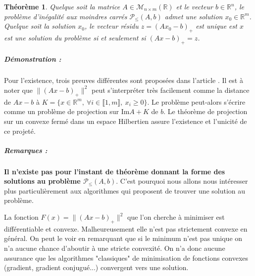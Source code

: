 \documentclass[10pt,a4paper]{article}
\newtheorem{thm}{Théorème}
\begin{document}
\begin{thm}
  Quelque soit la matrice $A \in \mathcal{M}_{n \times m}(\mathbb{R})$ et le vecteur $b \in \mathbb{R}^n$, le problème d'inégalité aux moindres carrés $\mathcal{P}_{\leq}(A, b)$ admet une solution $x_0 \in \mathbb{R}^m$.
  Quelque soit la solution $x_0$, le vecteur résidu $z = (Ax_0 - b)_+$ est unique est $x$ est une solution du problème si et seulement si $(Ax - b)_+ = z$.
\end{thm}
\subparagraph{Démonstration :}
Pour l'existence, trois preuves différentes sont proposées dans l'article \cite{LSCHUP}. Il est à noter que $\| (Ax-b)_+ \|^2$ peut s'interpréter très facilement comme la distance de $Ax-b$ à $K=\lbrace x \in \mathbb{R}^m, \ \forall i \in \llbracket 1,m \rrbracket, \ x_i \ge 0 \rbrace$. Le problème peut-alors s'écrire comme un problème de projection sur $\text{Im}A+K$ de $b$. Le théorème de projection sur un convexe fermé dans un espace Hilbertien assure l'existence et l'unicité de ce projeté.


\subparagraph{Remarques :} \textbf{Il n'existe pas pour l'instant de théorème donnant la forme des solutions au problème $\mathcal{P}_{\leq}(A, b)$}.
C'est pourquoi nous allons nous intéresser plus particulièrement aux algorithmes qui proposent de trouver une solution au problème.

La fonction $F(x)=\|(Ax-b)_+ \|^2$ que l'on cherche à minimiser est différentiable et convexe.
Malheureusement elle n'est pas strictement convexe en général. On peut le voir en remarquant que si le 
minimum n'est pas unique on n'a aucune chance d'aboutir à une stricte convexité.
On n'a donc aucune assurance que les algorithmes "classiques" de minimisation de fonctions convexes (gradient, gradient conjugué...) convergent vers une solution.


\end{document}
